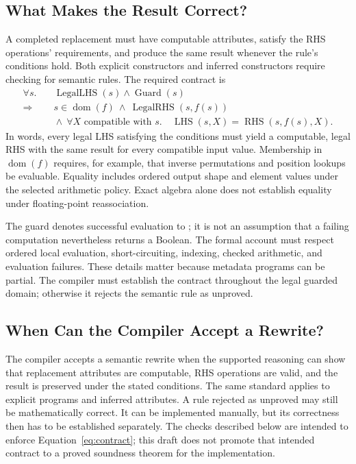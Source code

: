 \FloatBarrier
\subsection{What Makes the Result Correct?}
\label{sec:contract}
A completed replacement must have computable attributes, satisfy the RHS
operations' requirements, and produce the same result whenever the rule's
conditions hold. Both explicit constructors and inferred constructors require
checking for semantic rules. The required contract is
\begin{equation}
\begin{aligned}
\forall s.\quad &\operatorname{LegalLHS}(s)\land\operatorname{Guard}(s)\\
\Longrightarrow\quad
 &s\in\operatorname{dom}(f)\ \land\ \operatorname{LegalRHS}(s,f(s))\\
 &{}\land\ \forall X\text{ compatible with }s.\quad
 \operatorname{LHS}(s,X)=\operatorname{RHS}(s,f(s),X).
\end{aligned}
\label{eq:contract}
\end{equation}
In words, every legal LHS satisfying the conditions must yield a computable,
legal RHS with the same result for every compatible input value. Membership
in $\operatorname{dom}(f)$ requires, for example, that inverse permutations
and position lookups be evaluable. Equality includes ordered output shape
and element values under the selected arithmetic policy. Exact algebra alone
does not establish equality under floating-point reassociation.

The guard denotes successful evaluation to ; it is not an assumption
that a failing computation nevertheless returns a Boolean. The formal account
must respect ordered local evaluation, short-circuiting, indexing, checked
arithmetic, and evaluation failures. These details matter because metadata
programs can be partial. The compiler must establish the contract throughout
the legal guarded domain; otherwise it rejects the semantic rule as unproved.

\FloatBarrier
\subsection{When Can the Compiler Accept a Rewrite?}
The compiler accepts a semantic rewrite when the supported reasoning can show
that replacement attributes are computable, RHS operations are valid, and the
result is preserved under the stated conditions. The same standard applies
to explicit  programs and inferred attributes. A rule rejected
as unproved may still be mathematically correct. It can be implemented
manually, but its correctness then has to be established separately.
The checks described below are intended to enforce
Equation~\eqref{eq:contract}; this draft does not promote that intended
contract to a proved soundness theorem for the implementation.
